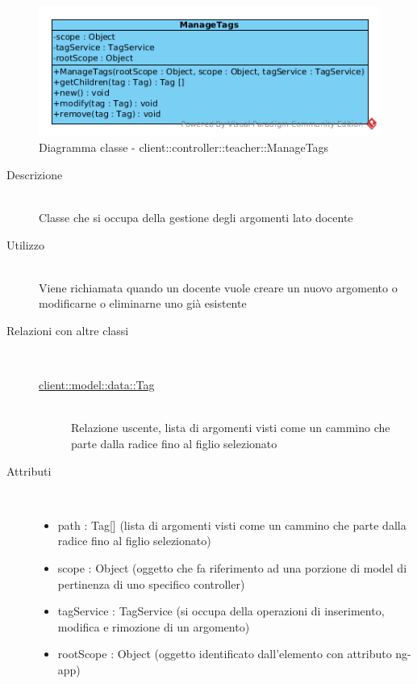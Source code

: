 \vspace{0.5cm}
\hypertarget{client::controller::teacher::ManageTags}{}
\begin{center}
			\begin{figure}[H]
				\centering \includegraphics[scale=4, max width=\textwidth, max height=\myheight]{../img/diagrammiClassi/client/controller/teacher/ManageTags.png}
				\caption{Diagramma classe - client::controller::teacher::ManageTags}
			\end{figure}
		\end{center}\begin{description}
\item[Descrizione] \hfill \\
 Classe che si occupa della gestione degli argomenti lato docente
\item[Utilizzo] \hfill \\
 Viene richiamata quando un docente vuole creare un nuovo argomento o modificarne o eliminarne uno già esistente
\item[Relazioni con altre classi] \hfill \\
 \vspace{-7mm}
\begin{description}
\item[\hyperlink{client::model::data::Tag}{client::model::data::Tag}] \hfill \\
 Relazione uscente, lista di argomenti visti come un cammino che parte dalla radice fino al figlio selezionato
\end{description}

\item[Attributi] \hfill \\
 \vspace{-7mm}
\begin{itemize}
\item path : Tag[] (lista di argomenti visti come un cammino che parte dalla radice fino al figlio selezionato)
\item scope : Object (oggetto che fa riferimento ad una porzione di model di pertinenza di uno specifico controller)
\item tagService : TagService (si occupa della operazioni di inserimento, modifica e rimozione di un argomento)
\item rootScope : Object (oggetto identificato dall’elemento con attributo ng-app)
\end{itemize}


\end{description}
